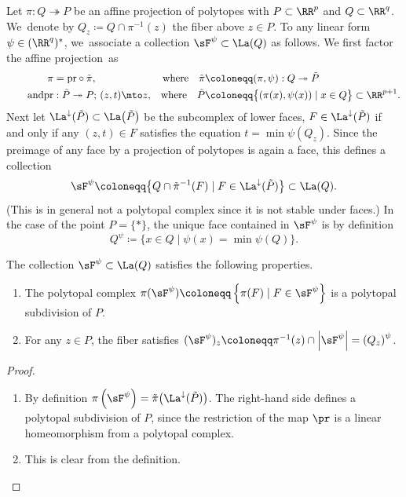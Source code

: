 Let $\pi: Q\twoheadrightarrow P$ be an affine projection of polytopes with
$P\subset \RR^p$ and $Q\subset \RR^q$.
We~denote by $Q_z\coloneqq Q\cap \pi^{-1}(z)$ the fiber above $z\in P$.
To any linear form $\psi\in (\RR^q)^{\ast}$, we~associate a
collection
$\sF^\psi\subset \La(Q)$ as follows.
We first factor the affine projection~as\vspace*{-3pt}
\begin{align*}
\pi&=\mathrm{pr}\circ \tilde{\pi},& \text{where} \quad
\tilde{\pi}&\coloneqq (\pi, \psi): Q\twoheadrightarrow \tilde{P}\\
\tag*{and}
\mathrm{pr}&: \tilde{P}\twoheadrightarrow P;\, (z, t)\mto z,&
\text{where}\quad \tilde{P}&\coloneqq \big\{(\pi(x), \psi(x))\mid x\in Q\big\}\subset \RR^{p+1}.
\end{align*}
Next let $\La^{\downarrow}(\tilde P) \subset \La\big(\tilde{P}\big)$ be the subcomplex of lower faces, \ie $F\in \La^{\downarrow}(\tilde P)$ if and only if any $(z, t)\in F$ satisfies the equation
$t = \min \psi(Q_z)$. Since the preimage of any face by a projection of polytopes is again a face, this defines a collection\vspace*{-3pt}\enlargethispage{.5\baselineskip}%
\[\sF^\psi \coloneqq
\big\{Q\cap \tilde{\pi}^{-1}(F) \mid F\in \La^{\downarrow}(\tilde P)
\big\}
\subset \La(Q).\]
(This is in general not a polytopal complex since it is not stable under faces.)
In the case of the point $P=\{\ast\}$, the unique face contained in $\sF^\psi$ is by definition\vspace*{-3pt}
\[Q^\psi\coloneqq\{x\in Q \mid \psi (x) = \min \psi(Q)\}.\]

\begin{proposition}\label{prop:CoherentSubdivision}
The collection $\sF^\psi \subset \La(Q)$ satisfies the following properties.
\begin{enumerate}
\item\label{prop:CoherentSubdivision1} The polytopal complex $\pi(\sF^\psi)\coloneqq\left\{\pi(F)\mid F\in \sF^\psi \right\}$ is a polytopal subdivision of $P$.
\item\label{prop:CoherentSubdivision2} For any $z\in P$, the fiber satisfies $(\sF^\psi)_z \coloneqq\pi^{-1}(z) \cap\left| \sF^\psi\right|=\left(Q_z\right)^\psi$.
\end{enumerate}
\end{proposition}

\skpt
\begin{proof}
\begin{enumerate}
\item By definition $\pi\left(\sF^\psi\right) = \tilde\pi\big(\La^{\downarrow}(\tilde P)\big)$. The right-hand side defines a polytopal subdivision of $P$, since the restriction of the map $\pr$ is a linear homeomorphism from a polytopal complex.
\item This is clear from the definition.\qedhere
\end{enumerate}
\end{proof}

